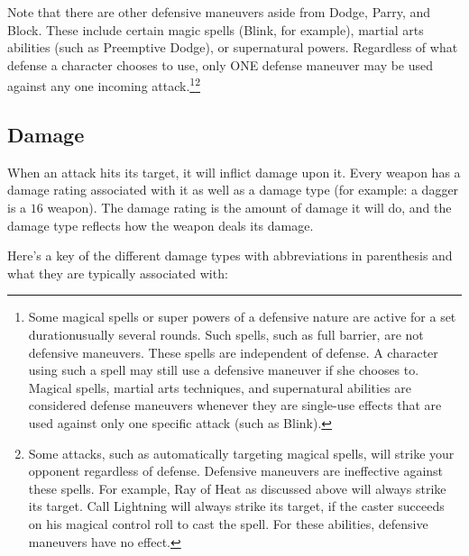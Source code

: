 \documentclass[twoside]{book}
\begin{document}
    {  
    Note that there are other defensive maneuvers
              aside from Dodge, Parry, and Block. These include
              certain magic spells (Blink, for example), martial arts
              abilities (such as Preemptive Dodge), or supernatural
              powers. Regardless of what defense a character chooses
              to use, only ONE defense maneuver may be used against
              any one incoming attack.\footnote{ Some magical spells or
              super powers of a defensive nature are active for a set
              durationusually several rounds. Such spells, such
              as full barrier, are not defensive maneuvers. These
              spells are independent of defense. A character using
              such a spell may still use a defensive maneuver if she
              chooses to.  Magical spells, martial arts techniques,
              and supernatural abilities are considered defense
              maneuvers whenever they are single-use effects that are
              used against only one specific attack (such as
              Blink).}\footnote{ Some attacks, such as
              automatically targeting magical spells, will strike your
              opponent regardless of defense. Defensive maneuvers are
              ineffective against these spells. For example, Ray of
              Heat as discussed above will always strike its
              target. Call Lightning will always strike its target, if
              the caster succeeds on his magical control roll to cast
              the spell. For these abilities, defensive maneuvers have
              no effect. }
            
    }
  
    

\subsection{Damage}
    
    {  
    When an attack hits its target, it will inflict
               damage upon it. Every weapon has a damage rating
               associated with it as well as a damage type (for example:
               a dagger is a \ensuremath{1}\ensuremath{6}\ensuremath{} weapon). The damage rating is the
               amount of damage it will do, and the damage type reflects
               how the weapon deals its damage. 
    }
  
    {  
    Here's a key of the different damage types
               with abbreviations in parenthesis and what they are
               typically associated with: 
    }
  
\end{document}
